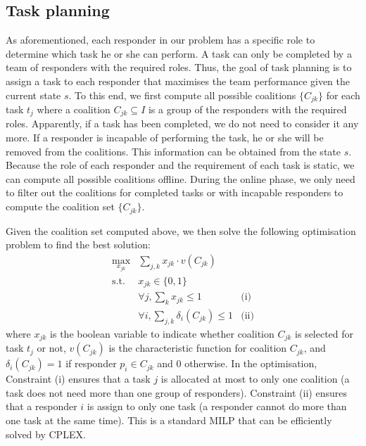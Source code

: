 \subsection{Task planning}
\label{sec:taskplanning}

\noindent As aforementioned, each responder in our problem has a
specific role to determine which task he or she can perform. A task
can only be completed by a team of responders with the required
roles. Thus, the goal of task planning is to assign a task to each
responder that maximises the team performance given the current
state $s$. To this end, we first compute all possible coalitions
$\{ C_{jk} \}$ for each task $t_j$ where a coalition $C_{jk}
\subseteq I$ is a group of the responders with the required roles.
Apparently, if a task has been completed, we do not need to
consider it any more. If a responder is incapable of performing the
task, he or she will be removed from the coalitions. This
information can be obtained from the state $s$. Because the role of
each responder and the requirement of each task is static, we can
compute all possible coalitions offline. During the online phase,
we only need to filter out the coalitions for completed tasks or
with incapable responders to compute the coalition set $\{ C_{jk}
\}$.

Given the coalition set computed above, we then solve the following
optimisation problem to find the best solution:
\begin{equation}
  \begin{array}{lll}
    \max\limits_{x_{jk}} & \sum_{j, k} x_{jk} \cdot v(C_{jk}) & \\[2pt]
    \mbox{s.t.} & x_{jk} \in \{0, 1\} & \\[2pt]
    & \forall j, \sum_{k} x_{jk} \leq 1 & \mbox{(i)} \\[2pt]
    & \forall i, \sum_{j, k} \delta_i(C_{jk}) \leq 1 & \mbox{(ii)}
  \end{array}
  \label{eq:cf}
\end{equation}
where $x_{jk}$ is the boolean variable to indicate whether
coalition $C_{jk}$ is selected for task $t_j$ or not, $v(C_{jk})$
is the characteristic function for coalition $C_{jk}$, and
$\delta_i(C_{jk}) = 1$ if responder $p_i\in C_{jk}$ and 0
otherwise. In the optimisation, Constraint (i) ensures that a task
$j$ is allocated at most to only one coalition (a task does not
need more than one group of responders). Constraint (ii) ensures
that a responder $i$ is assign to only one task (a responder cannot
do more than one task at the same time). This is a standard MILP
that can be efficiently solved by CPLEX.


